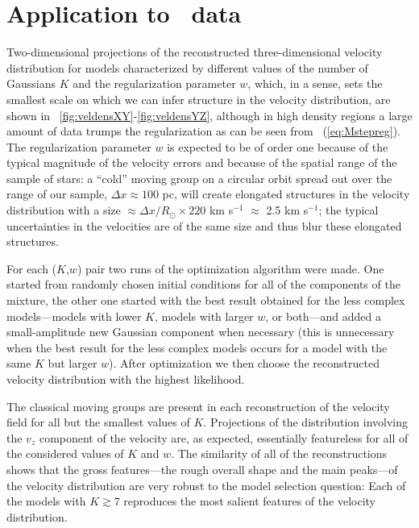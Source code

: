 \section{Application to \Hipparcos\ data}

Two-dimensional projections of the reconstructed three-dimensional
velocity distribution for models characterized by different values of
the number of Gaussians $K$ and the regularization parameter $w$,
which, in a sense, sets the smallest scale on which we can infer
structure in the velocity distribution, are shown in
\figuresname~\ref{fig:veldensXY}-\ref{fig:veldensYZ}, although in high
density regions a large amount of data trumps the regularization as
can be seen from \eqnname~(\ref{eq:Mstepreg}).  The regularization
parameter $w$ is expected to be of order one because of the typical
magnitude of the velocity errors and because of the spatial range of
the sample of stars: a ``cold'' moving group on a circular orbit
spread out over the range of our sample, $\Delta x\approx 100$ pc,
will create elongated structures in the velocity distribution with a
size $\approx \Delta x/R_\odot \times 220$ km s$^{-1}$ $\approx$ 2.5
km s$^{-1}$; the typical uncertainties in the velocities are of the
same size and thus blur these elongated structures. 

For each ($K$,$w$) pair two runs of the optimization algorithm were
made. One started from randomly chosen initial conditions for all of
the components of the mixture, the other one started with the best
result obtained for the less complex models---models with lower $K$,
models with larger $w$, or both---and added a small-amplitude new
Gaussian component when necessary (this is unnecessary when the best
result for the less complex models occurs for a model with the same
$K$ but larger $w$). After optimization we then choose the
reconstructed velocity distribution with the highest likelihood.

The classical moving groups are present in each reconstruction of the
velocity field for all but the smallest values of $K$. Projections of
the distribution involving the $v_z$ component of the velocity are, as
expected, essentially featureless for all of the considered values of
$K$ and $w$. The similarity of all of the reconstructions shows that
the gross features---the rough overall shape and the main peaks---of
the velocity distribution are very robust to the model selection
question: Each of the models with $K \gtrsim 7$ reproduces the most
salient features of the velocity distribution.

